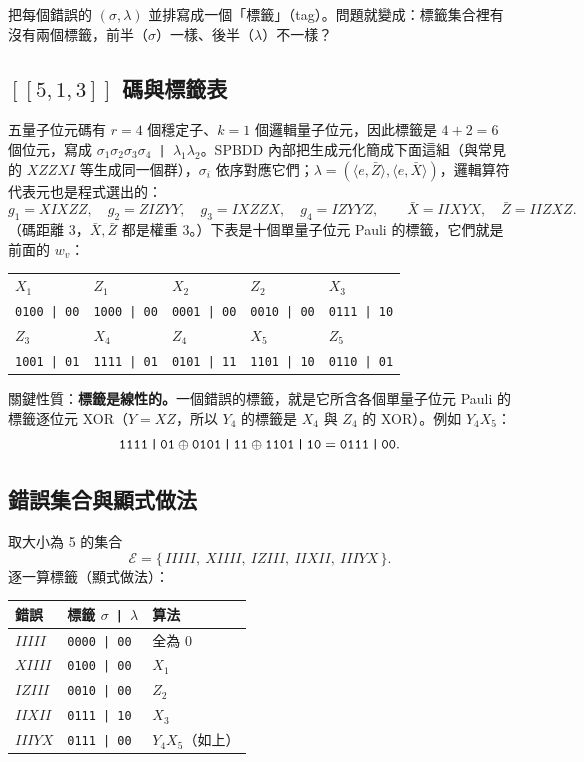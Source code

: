 \documentclass[a4paper,11pt,fontset=none]{ctexart}
\newcommand{\tg}[2]{\texttt{#1\,|\,#2}}
\newcommand{\E}{\mathcal{E}}
\theoremstyle{definition}
\begin{document}
把每個錯誤的 $(\sigma,\lambda)$ 並排寫成一個「標籤」（tag）。問題就變成：標籤集合裡有沒有兩個標籤，前半（$\sigma$）一樣、後半（$\lambda$）不一樣？

\subsection{$[[5,1,3]]$ 碼與標籤表}

五量子位元碼有 $r=4$ 個穩定子、$k=1$ 個邏輯量子位元，因此標籤是 $4+2=6$ 個位元，寫成 \tg{$\sigma_1\sigma_2\sigma_3\sigma_4$}{$\lambda_1\lambda_2$}。SPBDD 內部把生成元化簡成下面這組（與常見的 $XZZXI$ 等生成同一個群），$\sigma_i$ 依序對應它們；$\lambda=(\langle e,\bar Z\rangle,\langle e,\bar X\rangle)$，邏輯算符代表元也是程式選出的：
\[
g_1=XIXZZ,\quad g_2=ZIZYY,\quad g_3=IXZZX,\quad g_4=IZYYZ,\qquad \bar X=IIXYX,\quad \bar Z=IIZXZ .
\]
（碼距離 3，$\bar X,\bar Z$ 都是權重 3。）下表是十個單量子位元 Pauli 的標籤，它們就是前面的 $w_v$：

\begin{center}
\small
\begin{tabular}{@{}lllll@{}}
\toprule
$X_1$ & $Z_1$ & $X_2$ & $Z_2$ & $X_3$\\
\tg{0100}{00} & \tg{1000}{00} & \tg{0001}{00} & \tg{0010}{00} & \tg{0111}{10}\\
\midrule
$Z_3$ & $X_4$ & $Z_4$ & $X_5$ & $Z_5$\\
\tg{1001}{01} & \tg{1111}{01} & \tg{0101}{11} & \tg{1101}{10} & \tg{0110}{01}\\
\bottomrule
\end{tabular}
\end{center}

關鍵性質：\textbf{標籤是線性的。}一個錯誤的標籤，就是它所含各個單量子位元 Pauli 的標籤逐位元 XOR（$Y=XZ$，所以 $Y_4$ 的標籤是 $X_4$ 與 $Z_4$ 的 XOR）。例如 $Y_4X_5$：
\[
\tg{1111}{01}\oplus\tg{0101}{11}\oplus\tg{1101}{10}=\tg{0111}{00}.
\]

\subsection{錯誤集合與顯式做法}

取大小為 5 的集合
\[
\E=\{\,IIIII,\ XIIII,\ IZIII,\ IIXII,\ IIIYX\,\}.
\]
逐一算標籤（顯式做法）：

\begin{center}
\small
\begin{tabular}{@{}lll@{}}
\toprule
錯誤 & 標籤 \tg{$\sigma$}{$\lambda$} & 算法\\
\midrule
$IIIII$ & \tg{0000}{00} & 全為 0\\
$XIIII$ & \tg{0100}{00} & $X_1$\\
$IZIII$ & \tg{0010}{00} & $Z_2$\\
$IIXII$ & \tg{0111}{10} & $X_3$\\
$IIIYX$ & \tg{0111}{00} & $Y_4X_5$（如上）\\
\bottomrule
\end{tabular}
\end{center}
\end{document}
